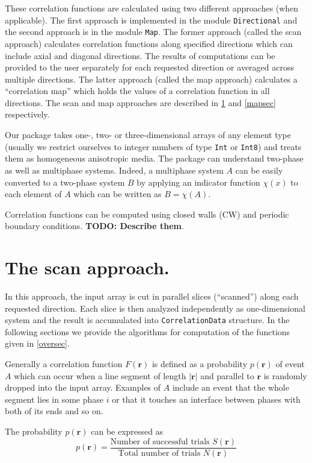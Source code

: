 \documentclass[reprint,amsmath,amssymb,aps,pre]{revtex4-1}
\newcommand{\code}[1]{\colorbox{light-gray}{\texttt{#1}}}
\begin{document}
These correlation functions are calculated using two different approaches (when
applicable). The first approach is implemented in the module \code{Directional}
and the second approach is in the module \code{Map}. The former approach (called
the scan approach) calculates correlation functions along specified directions
which can include axial and diagonal directions. The results of computations can
be provided to the user separately for each requested direction or averaged
across multiple directions. The latter approach (called the map approach)
calculates a ``correlation map'' which holds the values of a correlation
function in all directions. The scan and map approaches are described in
\cref{scansec} and \cref{mapsec} respectively.

Our package takes one-, two- or three-dimensional arrays of any element type
(usually we restrict ourselves to integer numbers of type \code{Int} or
\code{Int8}) and treats them as homogeneous anisotropic media. The package can
understand two-phase as well as multiphase systems. Indeed, a multiphase system
$A$ can be easily converted to a two-phase system $B$ by applying an indicator
function $\chi(x)$ to each element of $A$ which can be written as $B = \chi(A)$.

Correlation functions can be computed using closed walls (CW) and periodic
boundary conditions. \textbf{TODO: Describe them}.

\section{The scan approach.}
\label{scansec}
In this approach, the input array is cut in parallel slices (``scanned'') along
each requested direction. Each slice is then analyzed independently as
one-dimensional system and the result is accumulated into \code{CorrelationData}
structure. In the following sections we provide the algorithms for computation
of the functions given in \cref{oversec}.

Generally a correlation function $F(\bm{r})$ is defined as a probability
$p(\bm{r})$ of event $A$ which can occur when a line segment of length
$|\bm{r}|$ and parallel to $\bm{r}$ is randomly dropped into the input
array. Examples of $A$ include an event that the whole segment lies in some
phase $i$ or that it touches an interface between phases with both of its ends
and so on.

The probability $p(\bm{r})$ can be expressed as
\begin{equation}\label{eq:probability}
  p(\bm{r}) = \frac{\text{Number of successful trials $S(\bm{r})$}}
  {\text{Total number of trials $N(\bm{r})$}}
\end{equation}
\end{document}
